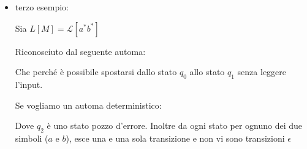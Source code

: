 {\begin{itemize}
        Si noti che $ba\in L[M]$ (ovvero $ba$ appartiene al linguaggio riconosciuto dall'automa $M$)  perché esiste un cammino da $q_0$ a $q_2$ etichettato $ba$

        Questo linguaggio è :
        \begin{itemize}
            \item $(q_0, b)$ offre 2 mosse o su $q_0$ o su $q_1$
            \item $(q_1, b)$ non offre mosse
            \item $(q_2, a/b)$ non offre mosse 
        \end{itemize}

        \item terzo esempio:
        
        Sia $L[M]=\mathcal{L}[a^*b^*]$

        Riconosciuto dal seguente automa:
        \begin{center}
        \end{center}

        Che  perché è possibile spostarsi dallo stato $q_0$ allo stato $q_1$ senza leggere l'input. 
        
        Se vogliamo un automa deterministico:
        \begin{center}
        \end{center}   
        Dove $q_2$ è uno stato pozzo d'errore. Inoltre da ogni stato per ognuno dei due simboli ($a$ e $b$), esce una e una sola transizione e non vi sono transizioni $\epsilon$

        
    \end{itemize}
}
